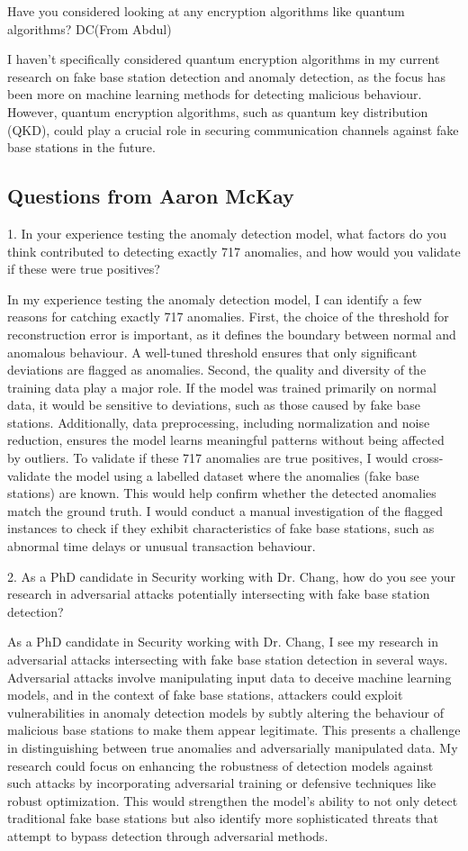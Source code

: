 Have you considered looking at any encryption algorithms like quantum algorithms? DC(From Abdul)

I haven't specifically considered quantum encryption algorithms in my current research on fake base station detection and anomaly detection, as the focus has been more on machine learning methods for detecting malicious behaviour. However, quantum encryption algorithms, such as quantum key distribution (QKD), could play a crucial role in securing communication channels against fake base stations in the future. 

\subsection{Questions from Aaron McKay}
1. In your experience testing the anomaly detection model, what factors do you think contributed to detecting exactly 717 anomalies, and how would you validate if these were true positives?

In my experience testing the anomaly detection model, I can identify a few reasons for catching exactly 717 anomalies. First, the choice of the threshold for reconstruction error is important, as it defines the boundary between normal and anomalous behaviour. A well-tuned threshold ensures that only significant deviations are flagged as anomalies. Second, the quality and diversity of the training data play a major role. If the model was trained primarily on normal data, it would be sensitive to deviations, such as those caused by fake base stations. Additionally, data preprocessing, including normalization and noise reduction, ensures the model learns meaningful patterns without being affected by outliers.
To validate if these 717 anomalies are true positives, I would cross-validate the model using a labelled dataset where the anomalies (fake base stations) are known. This would help confirm whether the detected anomalies match the ground truth. I would conduct a manual investigation of the flagged instances to check if they exhibit characteristics of fake base stations, such as abnormal time delays or unusual transaction behaviour.

2. As a PhD candidate in Security working with Dr. Chang, how do you see your research in adversarial attacks potentially intersecting with fake base station detection?

As a PhD candidate in Security working with Dr. Chang, I see my research in adversarial attacks intersecting with fake base station detection in several ways. Adversarial attacks involve manipulating input data to deceive machine learning models, and in the context of fake base stations, attackers could exploit vulnerabilities in anomaly detection models by subtly altering the behaviour of malicious base stations to make them appear legitimate. This presents a challenge in distinguishing between true anomalies and adversarially manipulated data. My research could focus on enhancing the robustness of detection models against such attacks by incorporating adversarial training or defensive techniques like robust optimization. This would strengthen the model's ability to not only detect traditional fake base stations but also identify more sophisticated threats that attempt to bypass detection through adversarial methods.
